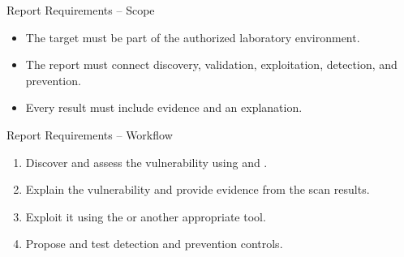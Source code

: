\begin{frame}[t]{Report Requirements -- Scope}
\vspace{0.25cm}
\begin{itemize}
  \setlength{\itemsep}{0.25cm}
  \item The target must be part of the authorized laboratory environment.
  \item The report must connect discovery, validation, exploitation, detection, and prevention.
  \item Every result must include evidence and an explanation.
\end{itemize}
\end{frame}

\begin{frame}[t]{Report Requirements -- Workflow}
\begin{enumerate}
  \setlength{\itemsep}{0.23cm}
  \item Discover and assess the vulnerability using  and .
  \item Explain the vulnerability and provide evidence from the scan results.
  \item Exploit it using the  or another appropriate tool.
  \item Propose and test detection and prevention controls.
\end{enumerate}
\end{frame}

